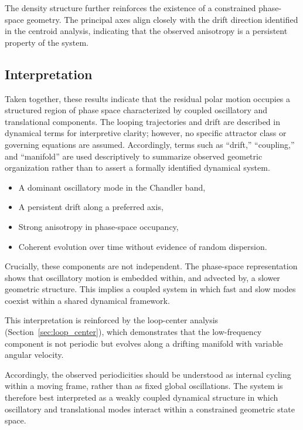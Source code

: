 \documentclass[twocolumn,9pt]{revtex4-2}
\begin{document}
The density structure further reinforces the existence of a constrained phase-space geometry. The principal axes align closely with the drift direction identified in the centroid analysis, indicating that the observed anisotropy is a persistent property of the system.

\subsection{Interpretation}
\label{subsec:interpretation}

Taken together, these results indicate that the residual polar motion occupies a structured region of phase space characterized by coupled oscillatory and translational components. The looping trajectories and drift are described in dynamical terms for interpretive clarity; however, no specific attractor class or governing equations are assumed. Accordingly, terms such as ``drift,'' ``coupling,'' and ``manifold'' are used descriptively to summarize observed geometric organization rather than to assert a formally identified dynamical system.

\begin{itemize}
\item A dominant oscillatory mode in the Chandler band,
\item A persistent drift along a preferred axis,
\item Strong anisotropy in phase-space occupancy,
\item Coherent evolution over time without evidence of
random dispersion.
\end{itemize}

Crucially, these components are not independent. The
phase-space representation shows that oscillatory motion
is embedded within, and advected by, a slower geometric
structure. This implies a coupled system in which fast
and slow modes coexist within a shared dynamical
framework.

This interpretation is reinforced by the loop-center analysis (Section~\ref{sec:loop_center}), which demonstrates that the low-frequency component is not periodic but evolves along a drifting manifold with variable angular velocity.

Accordingly, the observed periodicities should be
understood as internal cycling within a moving frame,
rather than as fixed global oscillations. The system is
therefore best interpreted as a weakly coupled dynamical
structure in which oscillatory and translational modes
interact within a constrained geometric state space.
\end{document}
